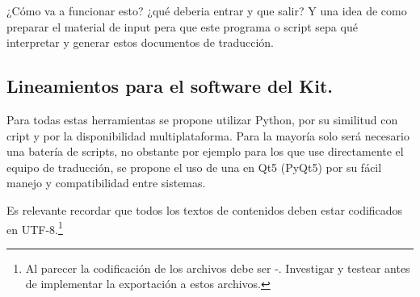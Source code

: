  ¿Cómo va a funcionar esto? ¿qué deberia entrar y que salir? Y una idea de como preparar el material de input pera que este programa o script sepa qué interpretar y generar estos documentos de traducción.

\subsection{Lineamientos para el software del Kit.}\label{kit:lineamientos-software-kit}
Para todas estas herramientas se propone utilizar Python, por su similitud con cript y por la disponibilidad multiplataforma. Para la mayoría solo será necesario una batería de scripts, no obstante por ejemplo para los que use directamente el equipo de traducción, se propone el uso de una  en Qt5 (PyQt5) por su fácil manejo y compatibilidad entre sistemas.

Es relevante recordar que todos los textos de contenidos deben estar codificados en UTF-8.\footnote{Al parecer la codificación de los archivos  debe ser -. Investigar y testear antes de implementar la exportación a estos archivos.}